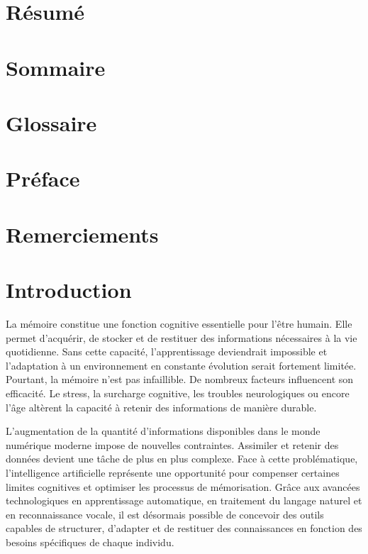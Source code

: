 \documentclass[12pt,a4paper]{report}
\begin{document}
\chapter*{Résumé}

\chapter*{Sommaire}
\tableofcontents

\listoffigures
\listoftables
\newpage

\chapter*{Glossaire}

\chapter*{Préface}

\chapter*{Remerciements}

\chapter*{Introduction}

La mémoire constitue une fonction cognitive essentielle pour l'être humain. Elle permet d'acquérir, de stocker et de restituer des informations nécessaires à la vie quotidienne. Sans cette capacité, l'apprentissage deviendrait impossible et l'adaptation à un environnement en constante évolution serait fortement limitée. Pourtant, la mémoire n'est pas infaillible. De nombreux facteurs influencent son efficacité. Le stress, la surcharge cognitive, les troubles neurologiques ou encore l'âge altèrent la capacité à retenir des informations de manière durable.

L'augmentation de la quantité d'informations disponibles dans le monde numérique moderne impose de nouvelles contraintes. Assimiler et retenir des données devient une tâche de plus en plus complexe. Face à cette problématique, l'intelligence artificielle représente une opportunité pour compenser certaines limites cognitives et optimiser les processus de mémorisation. Grâce aux avancées technologiques en apprentissage automatique, en traitement du langage naturel et en reconnaissance vocale, il est désormais possible de concevoir des outils capables de structurer, d'adapter et de restituer des connaissances en fonction des besoins spécifiques de chaque individu.
\end{document}
